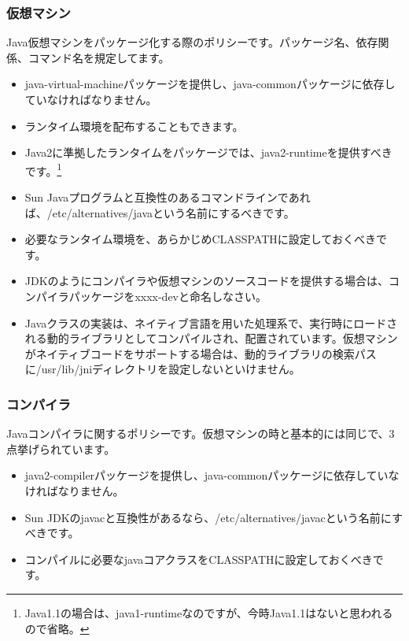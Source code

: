 \documentclass[mingoth,a4paper]{jsarticle}
\begin{document}
\subsubsection{仮想マシン}
Java仮想マシンをパッケージ化する際のポリシーです。パッケージ名、依存関係、コマンド名を規定してます。
\begin{itemize}
\item java-virtual-machineパッケージを提供し、java-commonパッケージに依存していなければなりません。
\item ランタイム環境を配布することもできます。
\item Java2に準拠したランタイムをパッケージでは、java2-runtimeを提供すべきです。\footnote{Java1.1の場合は、java1-runtimeなのですが、今時Java1.1はないと思われるので省略。}
\item Sun Javaプログラムと互換性のあるコマンドラインであれば、/etc/alternatives/javaという名前にするべきです。
\item 必要なランタイム環境を、あらかじめCLASSPATHに設定しておくべきです。
\item JDKのようにコンパイラや仮想マシンのソースコードを提供する場合は、コンパイラパッケージをxxxx-devと命名しなさい。
\item Javaクラスの実装は、ネイティブ言語を用いた処理系で、実行時にロードされる動的ライブラリとしてコンパイルされ、配置されています。仮想マシンがネイティブコードをサポートする場合は、動的ライブラリの検索パスに/usr/lib/jniディレクトリを設定しないといけません。
\end{itemize}

\subsubsection{コンパイラ}
Javaコンパイラに関するポリシーです。仮想マシンの時と基本的には同じで、3点挙げられています。
\begin{itemize}
\item java2-compilerパッケージを提供し、java-commonパッケージに依存していなければなりません。
\item Sun JDKのjavacと互換性があるなら、/etc/alternatives/javacという名前にすべきです。
\item コンパイルに必要なjavaコアクラスをCLASSPATHに設定しておくべきです。
\end{itemize}
\end{document}
